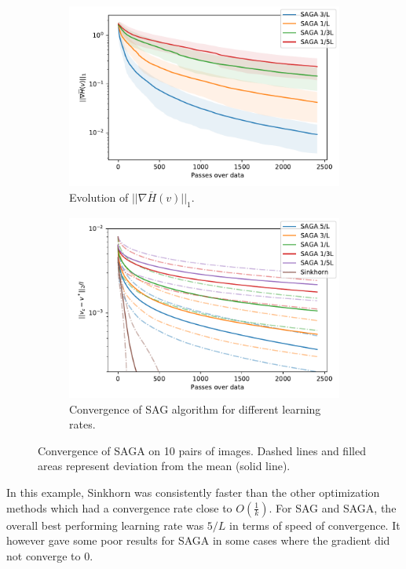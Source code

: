 \begin{figure}[h]
    \begin{subfigure}{.49\linewidth}
        \centering
        \includegraphics[width=\linewidth]{figures/saga_image_retreival_avg.pdf}
        \caption{Evolution of $||\nabla\overline{H}(v)||_1$.}
    \end{subfigure}
    \begin{subfigure}{.49\linewidth}
        \centering
        \includegraphics[width=\linewidth]{figures/saga_image_retreival_vs_avg.pdf}
        \caption{Convergence of SAG algorithm for different learning rates.}
    \end{subfigure}
    \caption{Convergence of SAGA on 10 pairs of images. Dashed lines and filled areas represent deviation from the mean (solid line).}
\end{figure}

In this example, Sinkhorn was consistently faster than the other optimization methods which had a convergence rate close to $O\left(\frac{1}{k}\right)$. For SAG and SAGA, the overall best performing learning rate was $5/L$ in terms of speed of convergence. It however gave some poor results for SAGA in some cases where the gradient did not converge to 0. 

